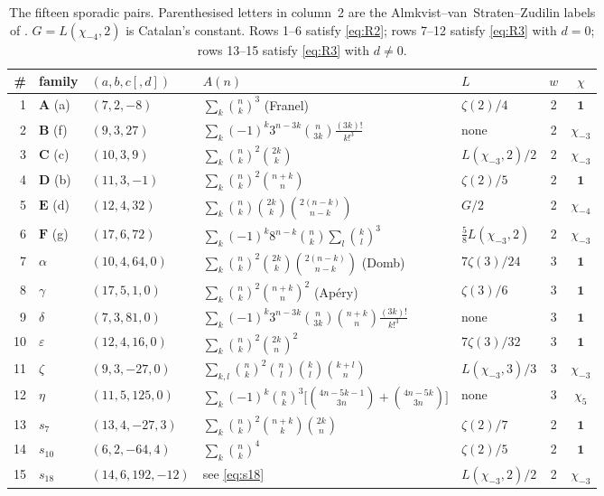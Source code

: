 \documentclass[11pt,reqno]{amsart}
\theoremstyle{plain}
\theoremstyle{definition}
\theoremstyle{remark}
\newcommand{\bin}[2]{\binom{#1}{#2}}
\numberwithin{equation}{section}
\begin{document}
\begin{table}[t]
\small
\setlength{\tabcolsep}{4pt}
\begin{tabular}{@{}rllll@{\ }cc@{}}
\toprule
\# & family & $(a,b,c[,d])$ & $A(n)$ & $L$ & $w$ & $\chi$\\
\midrule
1&$\mathbf A$ (a)&$(7,2,-8)$&$\sum_k\bin nk^3$ (Franel)&$\zeta(2)/4$&2&$\mathbf 1$\\
2&$\mathbf B$ (f)&$(9,3,27)$&$\sum_k(-1)^k3^{n-3k}\bin n{3k}\tfrac{(3k)!}{k!^3}$&none&2&$\chi_{-3}$\\
3&$\mathbf C$ (c)&$(10,3,9)$&$\sum_k\bin nk^2\bin{2k}k$&$L(\chi_{-3},2)/2$&2&$\chi_{-3}$\\
4&$\mathbf D$ (b)&$(11,3,-1)$&$\sum_k\bin nk^2\bin{n+k}n$&$\zeta(2)/5$&2&$\mathbf 1$\\
5&$\mathbf E$ (d)&$(12,4,32)$&$\sum_k\bin nk\bin{2k}k\bin{2(n-k)}{n-k}$&$G/2$&2&$\chi_{-4}$\\
6&$\mathbf F$ (g)&$(17,6,72)$&$\sum_k(-1)^k8^{n-k}\bin nk\sum_l\bin kl^3$&$\tfrac58L(\chi_{-3},2)$&2&$\chi_{-3}$\\
7&$\alpha$&$(10,4,64,0)$&$\sum_k\bin nk^2\bin{2k}k\bin{2(n-k)}{n-k}$ (Domb)&$7\zeta(3)/24$&3&$\mathbf 1$\\
8&$\gamma$&$(17,5,1,0)$&$\sum_k\bin nk^2\bin{n+k}n^2$ (Ap\'ery)&$\zeta(3)/6$&3&$\mathbf 1$\\
9&$\delta$&$(7,3,81,0)$&$\sum_k(-1)^k3^{n-3k}\bin n{3k}\bin{n+k}n\tfrac{(3k)!}{k!^3}$&none&3&$\mathbf 1$\\
10&$\varepsilon$&$(12,4,16,0)$&$\sum_k\bin nk^2\bin{2k}n^2$&$7\zeta(3)/32$&3&$\mathbf 1$\\
11&$\zeta$&$(9,3,-27,0)$&$\sum_{k,l}\bin nk^2\bin nl\bin kl\bin{k+l}n$&$L(\chi_{-3},3)/3$&3&$\chi_{-3}$\\
12&$\eta$&$(11,5,125,0)$&$\sum_k(-1)^k\bin nk^3\bigl[\bin{4n-5k-1}{3n}+\bin{4n-5k}{3n}\bigr]$&none&3&$\chi_{5}$\\
13&$s_7$&$(13,4,-27,3)$&$\sum_k\bin nk^2\bin{n+k}k\bin{2k}n$&$\zeta(2)/7$&2&$\mathbf 1$\\
14&$s_{10}$&$(6,2,-64,4)$&$\sum_k\bin nk^4$&$\zeta(2)/5$&2&$\mathbf 1$\\
15&$s_{18}$&$(14,6,192,-12)$&see \eqref{eq:s18}&$L(\chi_{-3},2)/2$&2&$\chi_{-3}$\\
\bottomrule
\end{tabular}
\medskip
\caption{The fifteen sporadic pairs. Parenthesised letters in column~2 are the
Almkvist--van~Straten--Zudilin labels of \cite[Table~1]{MalikStraub}. $G=L(\chi_{-4},2)$ is
Catalan's constant. Rows 1--6 satisfy \eqref{eq:R2}; rows 7--12 satisfy \eqref{eq:R3} with
$d=0$; rows 13--15 satisfy \eqref{eq:R3} with $d\ne0$.}
\label{tab:fifteen}
\end{table}
\end{document}
